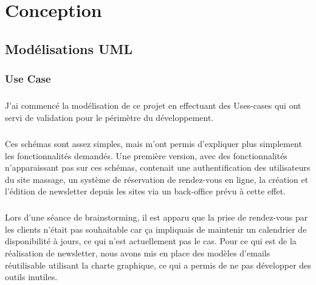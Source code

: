 \documentclass[11pt,a4paper,twoside]{report}
\begin{document}
\chapter{Conception}
	\section{Modélisations UML}
			\subsection{Use Case}
				\paragraph*{}J'ai commencé la modélisation de ce projet en effectuant des Uses-cases qui ont servi de validation pour le périmètre du développement.
				\paragraph*{}Ces schémas sont assez simples, mais m'ont permis d'expliquer plus simplement les fonctionnalités demandés. Une première version, avec des fonctionnalités n'apparaissant pas sur ces schémas, contenait une authentification des utilisateurs du site massage, un système de réservation de rendez-vous en ligne, la création et l'édition de newsletter depuis les sites via un back-office prévu à cette effet.
				\paragraph*{}Lors d'une séance de brainstorming, il est apparu que la prise de rendez-vous par les clients n'était pas souhaitable car ça impliquais de maintenir un calendrier de disponibilité à jours, ce qui n'est actuellement pas le cas. Pour ce qui est de la réalisation de newsletter, nous avons mis en place des modèles d'emails réutilisable utilisant la charte graphique, ce qui a permis de ne pas développer des outils inutiles.
\end{document}

